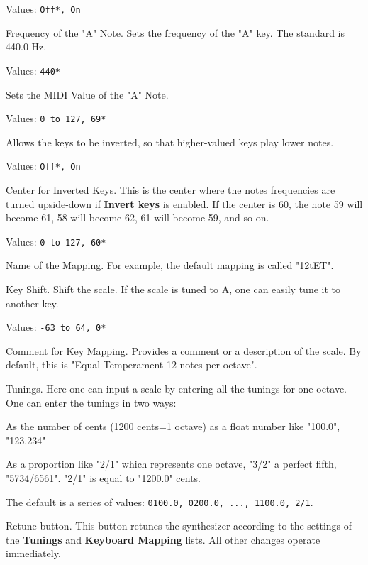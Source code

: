    Values: \texttt{Off*, On}

   Frequency of the "A" Note.
   Sets the frequency of the "A" key. The standard is 440.0 Hz.

   Values: \texttt{440*}

   Sets the MIDI Value of the "A" Note.

   Values: \texttt{0 to 127, 69*}

   Allows the keys to be inverted, so that higher-valued keys play lower
   notes.

   Values: \texttt{Off*, On}

   Center for Inverted Keys.
   This is the center where the notes frequencies are turned upside-down if
   \textbf{Invert keys} is enabled.
   If the center is 60, the note 59 will become 61, 58 will become 62, 61
   will become 59, and so on.

   Values: \texttt{0 to 127, 60*}

   Name of the Mapping.
   For example, the default mapping is called "12tET".

   Key Shift.
   Shift the scale. If the scale is tuned to A, one can easily tune it to
   another key.

   Values: \texttt{-63 to 64, 0*}

   Comment for Key Mapping.
   Provides a comment or a description of the scale.
   By default, this is "Equal Temperament 12 notes per octave".

   Tunings.
   Here one can input a scale by entering all the tunings for one octave. 
   One can enter the tunings in two ways: 

   \begin{enumber}
      \item As the number of cents (1200 cents=1 octave) as a float number
         like "100.0", "123.234"
      \item As a proportion like "2/1" which represents one octave, "3/2" a
         perfect fifth, "5734/6561".  "2/1" is equal to "1200.0" cents.
   \end{enumber}

   The default is a series of values:
   \texttt{0100.0, 0200.0, ..., 1100.0, 2/1}.

   Retune button.
   This button retunes the synthesizer according to the settings of
   the \textbf{Tunings} and \textbf{Keyboard Mapping} lists.
   All other changes operate immediately.

